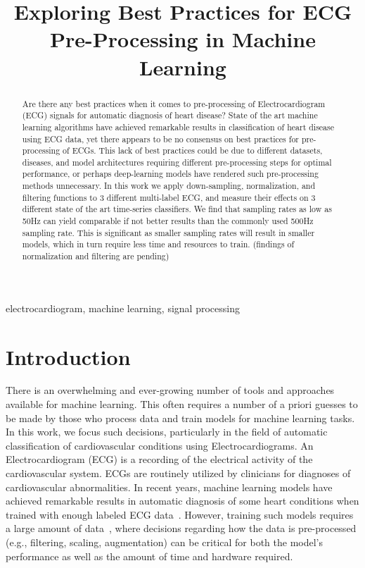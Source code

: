 \documentclass[pmlr,twocolumn]{jmlr}%
\title[ECG Scaling]{Exploring Best Practices for ECG Pre-Processing in Machine Learning}
\author{\Name{Amir Salimi} \Email{{asalimi@ualberta.ca}\\
\Name{Abram Hindle} \Email{abram.hindle@ualberta.ca}\\
\Name{Osmar Zaiane} \Email{zaiane@ualberta.ca}\\
\Name{others} \Email{CVC@ualberta.ca}\\
\addr University of Alberta}}
\begin{document}
\maketitle

\begin{abstract}
Are there any best practices when it comes to pre-processing of Electrocardiogram (ECG) signals for automatic diagnosis of heart disease? 
State of the art machine learning algorithms have achieved remarkable results in classification of heart disease using ECG data, yet there appears to be no consensus on best practices for pre-processing of ECGs.  This lack of best practices could be due to different datasets, diseases, and model architectures requiring different pre-processing steps for optimal performance, or perhaps deep-learning models have rendered such pre-processing methods unnecessary. In this work we apply down-sampling, normalization, and filtering functions to 3 different multi-label ECG, and measure their effects on 3 different state of the art time-series classifiers. We find that sampling rates as low as 50Hz can yield comparable if not better results than the commonly used 500Hz sampling rate. This is significant as smaller sampling rates will result in smaller models, which in turn require less time and resources to train. (findings of normalization and filtering are pending)

\end{abstract}
\begin{keywords}
electrocardiogram, machine learning, signal processing
\end{keywords}


\section{Introduction}
\label{sec:intro}
There is an overwhelming and ever-growing number of tools and approaches available for machine learning. This often requires a number of a priori guesses to be made by those who process data and train models for machine learning tasks. In this work, we focus such decisions, particularly in the field of automatic classification of cardiovascular conditions using Electrocardiograms. 
An Electrocardiogram (ECG) is a recording of the electrical activity of the cardiovascular system. ECGs are routinely utilized by clinicians for diagnoses of cardiovascular abnormalities. In recent years, machine learning models have achieved remarkable results in automatic diagnosis of some heart conditions when trained with enough labeled ECG data~\cite{reyna2021will,reyna4issues}. However, training such models requires a large amount of data~\cite{reyna2021will,reyna4issues,natarajan2020wide,ribeiro2020automatic}, where decisions regarding how the data is pre-processed (e.g., filtering, scaling, augmentation) can be critical for both the model's performance as well as the amount of time and hardware required. 
\end{document}
